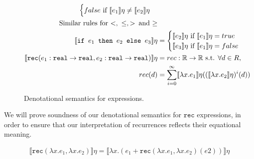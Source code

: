 \begin{figure}
\begin{align*}
\begin{cases}
      false \text{  if } \llbracket e_1 \rrbracket\eta \neq \llbracket e_2\rrbracket\eta \\
   \end{cases}
 \\
\text{Similar rules for $<, \ \leq , >$\, and $\geq$} \\
  \llbracket \texttt{if } e_1 \texttt{ then } e_2 \texttt{ else } e_3 \rrbracket \eta &= 
 \begin{cases} 
      \llbracket e_2 \rrbracket\eta \text{ if } \llbracket e_1 \rrbracket\eta = true \\
      \llbracket e_3 \rrbracket\eta \text{ if } \llbracket e_1 \rrbracket\eta = false \\
   \end{cases}
  \\
   \llbracket  \texttt{rec} (e_1 : \texttt{real} \rightarrow \texttt{real}, e_2 : \texttt{real} \rightarrow \texttt{real}) \rrbracket\eta &= rec : \mathbb{R} \rightarrow \mathbb{R} \text{ s.t. } \forall d \in R, \\
   rec(d) &= \sum_{i=0}^{\infty}\llbracket \lambda x.e_1 \rrbracket\eta ((\llbracket \lambda x.e_2 \rrbracket\eta)^i(d))
 \end{align*}
 \caption{Denotational semantics for expressions.}
 \label{fig:densemexps}
 \end{figure}
 
  We will prove soundness of our denotational semantics for $\texttt{rec}$ expressions, in order to ensure that
 our interpretation of recurrences reflects their equational meaning.
 \begin{thm}
 \begin{align*}
 \llbracket \texttt{rec}(\lambda x.e_1, \lambda x.e_2) \rrbracket \eta 
 = \llbracket \lambda x.(e_1 + \texttt{rec}(\lambda x.e_1, \lambda x.e_2)(e2)) \rrbracket \eta
 \end{align*} 
 \end{thm}
 
